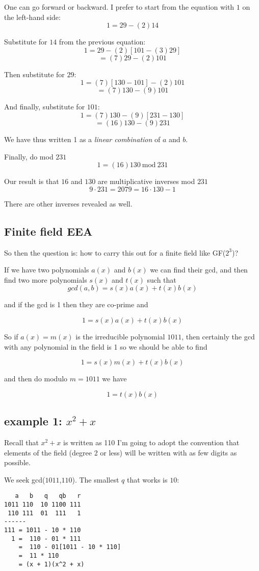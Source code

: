 \documentclass[11pt, oneside]{article}
\begin{document}
One can go forward or backward.  I prefer to start from the equation with $1$ on the left-hand side:
\[ 1 = 29 - (2)14 \]

Substitute for $14$ from the previous equation:
\[ 1 = 29 - (2)[101 - (3)29] \]
\[ = (7)29 - (2)101 \]

Then substitute for $29$:
\[ 1 = (7)[130 - 101] - (2)101 \]
\[ = (7)130 - (9)101 \]

And finally, substitute for $101$:
\[ 1 = (7)130 - (9)[231 - 130] \]
\[  = (16)130 - (9)231 \]

We have thus written 1 as a \emph{linear combination} of $a$ and $b$.  

Finally, do mod $231$
\[ 1 = (16)130\ \text{mod}\ 231 \]

Our result is that $16$ and $130$ are multiplicative inverses mod $231$
\[ 9 \cdot 231 = 2079 = 16 \cdot 130 - 1 \]

There are other inverses revealed as well.

\subsection*{Finite field EEA}

So then the question is:  how to carry this out for a finite field like GF($2^3$)?

If we have two polynomials $a(x)$ and $b(x)$ we can find their gcd, and then find two more polynomials $s(x)$ and $t(x)$ such that
\[ gcd(a,b) = s(x)a(x) + t(x)b(x) \]

and if the gcd is 1 then they are co-prime and

\[ 1 = s(x)a(x) + t(x)b(x) \]

So if $a(x) = m(x)$ is the irreducible polynomial $1011$, then certainly the gcd with any polynomial in the field is 1 so we should be able to find

\[ 1 = s(x)m(x) + t(x)b(x) \]

and then do modulo $m = 1011$ we have

\[ 1 = t(x)b(x) \]

\subsection*{example 1: $ x^2 + x$}
Recall that $x^2 + x$ is written as 110   I'm going to adopt the convention that elements of the field (degree 2 or less) will be written with as few digits as possible.

We seek gcd($1011$,$110$).  The smallest $q$ that works is $10$:
\begin{verbatim}
   a   b   q   qb   r
1011 110  10 1100 111
 110 111  01  111   1
------
111 = 1011 - 10 * 110
  1 =  110 - 01 * 111
    =  110 - 01[1011 - 10 * 110]
    =  11 * 110
    = (x + 1)(x^2 + x)
\end{verbatim}
\end{document}
